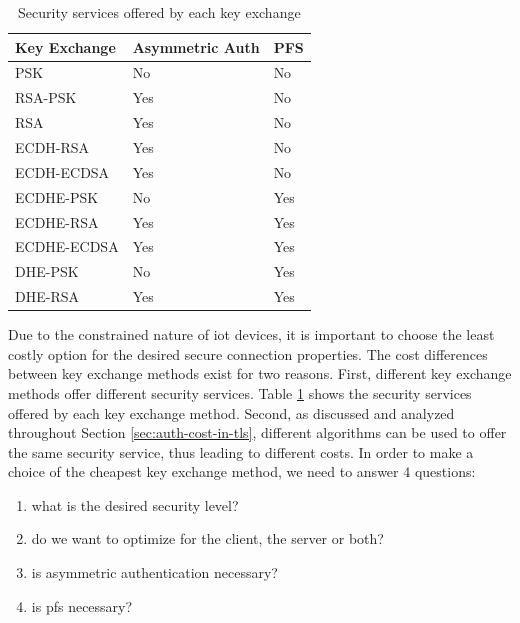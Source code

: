 \begin{table}[]
\begin{tabular}{|l|l|l|}
\hline
\textbf{Key Exchange}                     & \textbf{Asymmetric Auth} & \textbf{PFS} \\ \hline
PSK         & No                       & No           \\ \hline
RSA-PSK     & Yes                      & No           \\ \hline
RSA         & Yes                      & No           \\ \hline
ECDH-RSA    & Yes                      & No           \\ \hline
ECDH-ECDSA  & Yes                      & No           \\ \hline
ECDHE-PSK   & No                       & Yes          \\ \hline
ECDHE-RSA   & Yes                      & Yes          \\ \hline
ECDHE-ECDSA & Yes                      & Yes          \\ \hline
DHE-PSK     & No                       & Yes          \\ \hline
DHE-RSA     & Yes                      & Yes          \\ \hline
\end{tabular}
\centering \caption{\label{table:key-exch-sec-ser} Security services offered by each key exchange}
\end{table}


Due to the constrained nature of \gls{iot} devices, it is important to choose the least costly option for the desired secure
connection properties.
The cost differences between key exchange methods exist for two reasons. First, different key exchange methods offer different
security services. Table \ref{table:key-exch-sec-ser} shows the security services offered by each key exchange method. Second, as
discussed and analyzed throughout Section \ref{sec:auth-cost-in-tls}, different algorithms can be used to offer the same
security service, thus leading to different costs. In order to make a choice of the cheapest key
exchange method, we need to answer $4$ questions:

\begin{enumerate}
  \item what is the desired security level?
  \item do we want to optimize for the client, the server or both?
  \item is asymmetric authentication necessary?
  \item is \gls{pfs} necessary?
\end{enumerate}

